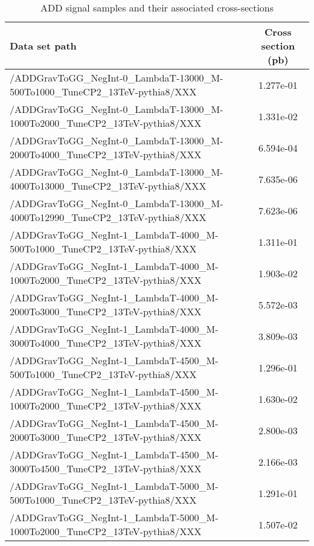 \begin{landscape}
\begin{table}[!htbp]
       \caption{ ADD signal samples and their associated cross-sections }
       \centering
       \vspace{\baselineskip}
       \begin{tabular}{lc}
       \hline \hline
       Data set path & Cross section (pb)\\
       \hline
/ADDGravToGG\_NegInt-0\_LambdaT-13000\_M-500To1000\_TuneCP2\_13TeV-pythia8/XXX &  1.277e-01\\
/ADDGravToGG\_NegInt-0\_LambdaT-13000\_M-1000To2000\_TuneCP2\_13TeV-pythia8/XXX &  1.331e-02\\
/ADDGravToGG\_NegInt-0\_LambdaT-13000\_M-2000To4000\_TuneCP2\_13TeV-pythia8/XXX &  6.594e-04\\
/ADDGravToGG\_NegInt-0\_LambdaT-13000\_M-4000To13000\_TuneCP2\_13TeV-pythia8/XXX &  7.635e-06\\
/ADDGravToGG\_NegInt-0\_LambdaT-13000\_M-4000To12990\_TuneCP2\_13TeV-pythia8/XXX &  7.623e-06\\
/ADDGravToGG\_NegInt-1\_LambdaT-4000\_M-500To1000\_TuneCP2\_13TeV-pythia8/XXX &  1.311e-01\\
/ADDGravToGG\_NegInt-1\_LambdaT-4000\_M-1000To2000\_TuneCP2\_13TeV-pythia8/XXX &  1.903e-02\\
/ADDGravToGG\_NegInt-1\_LambdaT-4000\_M-2000To3000\_TuneCP2\_13TeV-pythia8/XXX &  5.572e-03\\
/ADDGravToGG\_NegInt-1\_LambdaT-4000\_M-3000To4000\_TuneCP2\_13TeV-pythia8/XXX &  3.809e-03\\
/ADDGravToGG\_NegInt-1\_LambdaT-4500\_M-500To1000\_TuneCP2\_13TeV-pythia8/XXX &  1.296e-01\\
/ADDGravToGG\_NegInt-1\_LambdaT-4500\_M-1000To2000\_TuneCP2\_13TeV-pythia8/XXX &  1.630e-02\\
/ADDGravToGG\_NegInt-1\_LambdaT-4500\_M-2000To3000\_TuneCP2\_13TeV-pythia8/XXX &  2.800e-03\\
/ADDGravToGG\_NegInt-1\_LambdaT-4500\_M-3000To4500\_TuneCP2\_13TeV-pythia8/XXX &  2.166e-03\\
/ADDGravToGG\_NegInt-1\_LambdaT-5000\_M-500To1000\_TuneCP2\_13TeV-pythia8/XXX &  1.291e-01\\
/ADDGravToGG\_NegInt-1\_LambdaT-5000\_M-1000To2000\_TuneCP2\_13TeV-pythia8/XXX &  1.507e-02\\

       \hline \hline
       \end{tabular}
       \label{table:ADD_signal_samples_xsec}
\end{table}
\end{landscape}






